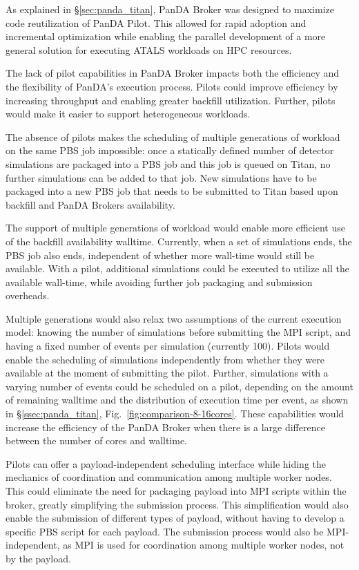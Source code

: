 As explained in \S\ref{sec:panda_titan}, PanDA Broker was designed to
maximize code reutilization of PanDA Pilot. This allowed for rapid adoption
and incremental optimization while enabling the parallel development of a
more general solution for executing ATALS workloads on HPC resources.

The lack of pilot capabilities in PanDA Broker impacts both the efficiency
and the flexibility of PanDA's execution process. Pilots could improve
efficiency by increasing throughput and enabling greater backfill
utilization. Further, pilots would make it easier to support heterogeneous
workloads.

The absence of pilots makes the scheduling of multiple generations of
workload on the same PBS job impossible: once a statically defined number of
detector simulations are packaged into a PBS job and this job is queued on
Titan, no further simulations can be added to that job. New simulations have
to be packaged into a new PBS job that needs to be submitted to Titan based
upon backfill and PanDA Brokers availability.

The support of multiple generations of workload would enable more efficient
use of the backfill availability walltime. Currently, when a set of
simulations ends, the PBS job also ends, independent of whether more
wall-time would still be available. With a pilot, additional simulations
could be executed to utilize all the available wall-time, while avoiding
further job packaging and submission overheads.

Multiple generations would also relax two assumptions of the current
execution model: knowing the number of simulations before submitting the MPI
script, and having a fixed number of events per simulation (currently 100).
Pilots would enable the scheduling of simulations independently from whether
they were available at the moment of submitting the pilot. Further,
simulations with a varying number of events could be scheduled on a pilot,
depending on the amount of remaining walltime and the distribution of
execution time per event, as shown in \S\ref{ssec:panda_titan},
Fig.~\ref{fig:comparison-8-16cores}. These capabilities would increase the
efficiency of the PanDA Broker when there is a large difference between the
number of cores and walltime.

Pilots can offer a payload-independent scheduling interface while hiding the
mechanics of coordination and communication among multiple worker nodes. This
could eliminate the need for packaging payload into MPI scripts within the
broker, greatly simplifying the submission process. This simplification would
also enable the submission of different types of payload, without having to
develop a specific PBS script for each payload. The submission process would
also be MPI-independent, as MPI is used for coordination among multiple
worker nodes, not by the payload.

